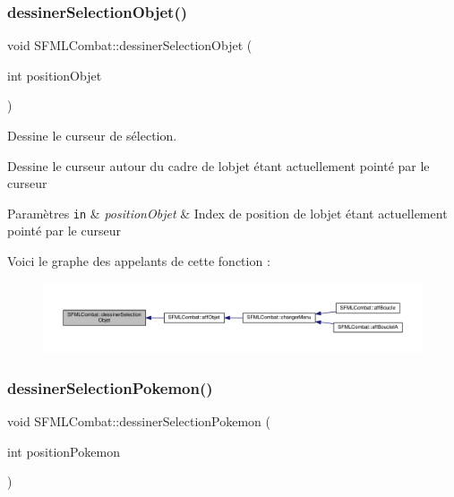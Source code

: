 \subsubsection{\texorpdfstring{dessiner\+Selection\+Objet()}{dessinerSelectionObjet()}}
{\footnotesize\ttfamily void S\+F\+M\+L\+Combat\+::dessiner\+Selection\+Objet (\begin{DoxyParamCaption}\item[{int}]{position\+Objet }\end{DoxyParamCaption})\hspace{0.3cm}{\ttfamily [private]}}



Dessine le curseur de sélection. 

Dessine le curseur autour du cadre de l\textquotesingle{}objet étant actuellement pointé par le curseur 
\begin{DoxyParams}[1]{Paramètres}
\mbox{\tt in}  & {\em position\+Objet} & Index de position de l\textquotesingle{}objet étant actuellement pointé par le curseur \\
\hline
\end{DoxyParams}
Voici le graphe des appelants de cette fonction \+:\nopagebreak
\begin{figure}[H]
\begin{center}
\leavevmode
\includegraphics[width=350pt]{class_s_f_m_l_combat_a578125c9faee0eebfaa898b5d6ae6f6e_icgraph}
\end{center}
\end{figure}
\mbox{\label{class_s_f_m_l_combat_ab37fca053d9f0e3529502c69f0de1055}} 
\subsubsection{\texorpdfstring{dessiner\+Selection\+Pokemon()}{dessinerSelectionPokemon()}}
{\footnotesize\ttfamily void S\+F\+M\+L\+Combat\+::dessiner\+Selection\+Pokemon (\begin{DoxyParamCaption}\item[{int}]{position\+Pokemon }\end{DoxyParamCaption})\hspace{0.3cm}{\ttfamily [private]}}



